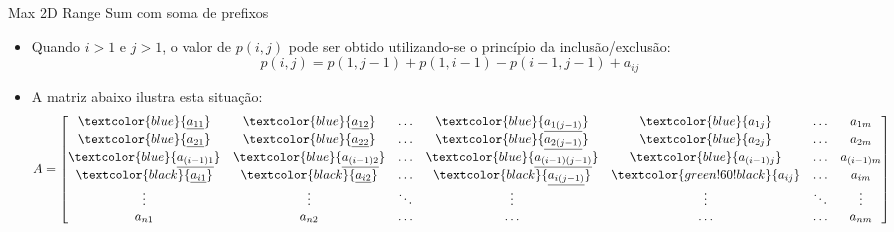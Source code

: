 \begin{frame}[fragile]{Max 2D Range Sum com soma de prefixos}

    \begin{itemize}
        \item Quando $i > 1$ e $j > 1$, o valor de $p(i, j)$ pode ser obtido utilizando-se o
            princípio da inclusão/exclusão:
        \[
            p(i, j) = p(1, j - 1) + p(1, i - 1) - p(i - 1, j - 1) + a_{ij}
        \]
        
        \item A matriz abaixo ilustra esta situação:
        \[
            A = \begin{bmatrix}
                    \textcolor{blue}{\underline{a_{11}}} & \textcolor{blue}{\underline{a_{12}}} &
                        \ldots & \textcolor{blue}{\underline{a_{1(j - 1)}}} & \textcolor{blue}{a_{1j}} & \ldots & a_{1m} \\
                    \textcolor{blue}{\underline{a_{21}}} & \textcolor{blue}{\underline{a_{22}}} &
                        \ldots & \textcolor{blue}{\underline{a_{2(j - 1)}}} & \textcolor{blue}{a_{2j}} & \ldots & a_{2m} \\
                    \textcolor{blue}{\underline{a_{(i - 1)1}}} & \textcolor{blue}{\underline{a_{(i - 1)2}}} &
                        \ldots & \textcolor{blue}{\underline{a_{(i - 1)(j - 1)}}} & \textcolor{blue}{a_{(i - 1)j}} & \ldots & a_{(i - 1)m} \\
                    \textcolor{black}{\underline{a_{i1}}} & \textcolor{black}{\underline{a_{i2}}} &
                        \ldots & \textcolor{black}{\underline{a_{i(j - 1)}}} & \textcolor{green!60!black}{a_{ij}} & \ldots & a_{im} \\
                \vdots & \vdots & \ddots & \vdots & \vdots & \ddots & \vdots \\
                a_{n1} & a_{n2} & \ldots & \ldots & \ldots & \ldots & a_{nm} \\
                \end{bmatrix}
        \]
    \end{itemize}

\end{frame}

